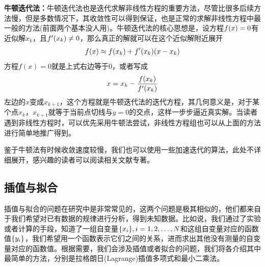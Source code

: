 \documentclass[12pt,a4paper,openany,twoside]{book}
\numberwithin{equation}{section}
\begin{document}
      \textbf{牛顿迭代法：}牛顿迭代法也是迭代求解非线性方程的重要方法，尽管比很多后续方法慢，但是多数情况下，其收敛性可以得到保证，也是正常的求解非线性方程中最一般的方法(前面两个基本没人用)。牛顿迭代法的核心思想是，设方程$f\qty(x)=0$有近似解$x_k$，且$f'\qty(x_k)\neq0$，那么真正的解就可以在这个近似解附近展开
      \begin{equation*}
        f(x)\approx f\qty(x_k)+f'\qty(x_k)\qty(x-x_k)
      \end{equation*}
      方程$f(x)=0$就是上式右边等于0，或者写成
      \begin{equation*}
        x=x_k-\frac{f\qty(x_k)}{f'\qty(x_k)}
      \end{equation*}
      左边的$x$变成$x_{k+1}$，这个方程就是牛顿迭代法的迭代方程，其几何意义是，对于某个点$x_k$，$x_{k+1}$就等于当前点切线与$y=0$的交点，这样一步步逼近真实解。当读者遇到非线性方程时，可以优先采用牛顿法尝试，非线性方程组也可以从上面的方法进行简单地推广得到。

      鉴于牛顿法有时候收敛速度较慢，我们也可以使用一些加速迭代的算法，此处不详细展开，感兴趣的读者可以阅读相关文献专著。
    \subsection{插值与拟合}
      插值与拟合的问题在研究中是非常常见的，这两个问题是极其相似的，他们都来自于我们希望对已有数据的规律进行分析，得到未知数据。比如说，我们通过了实验或者计算的手段，知道了一组自变量$\qty{x_i},i=1,2,\dots,N$和这组自变量对应的函数值$\qty{y_i}$，我们希望用一个函数表示它们之间的关系，进而求出其他没有测量的自变量对应的函数值。根据需要，我们会涉及插值或者拟合的问题，我们将各介绍其中最简单的方法，分别是拉格朗日(Lagrange)插值多项式和最小二乘法。
\end{document}
